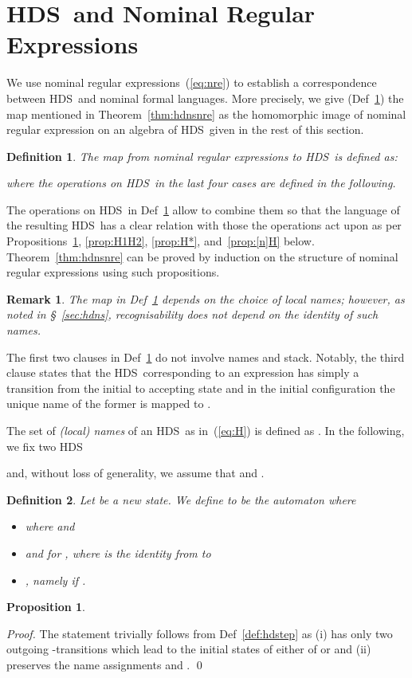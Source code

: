 \documentclass[runningheads,a4paper]{llncs}
\newcommand{\longversion}[1]{#1}
\newcommand{\hdns}{HDS}
\newtheorem{definition}{Theorem}[section]
\newtheorem{proposition}{Theorem}[section]
\newtheorem{remark}{Theorem}[section]
\newtheorem{definition}{Definition}[section]
\newtheorem{proposition}{Proposition}[section]
\newtheorem{remark}{Remark}[section]
\begin{document}
\section{\hdns\ and Nominal Regular Expressions}\label{sec:hsnre}
We use nominal regular expressions~(\ref{eq:nre}) to establish a
correspondence between \hdns\ and nominal formal languages.
More precisely, we give (Def~\ref{def:nretohdns}) the map mentioned in
Theorem~\ref{thm:hdnsnre} as the homomorphic image of nominal regular
expression on an algebra of \hdns\ given in the rest of this section.
\begin{definition}\label{def:nretohdns}
   The map  from nominal regular expressions to \hdns\
  is defined as:
  
  where the operations on \hdns\ in the last four cases are defined in
  the following.
\end{definition}
The operations on \hdns\ in Def~\ref{def:nretohdns} allow to combine
them so that the language of the resulting \hdns\ has a clear relation
with those the operations act upon as per
Propositions~\ref{prop:hdsum}, \ref{prop:H1H2}, \ref{prop:H*},
and~\ref{prop:[n]H} below.
Theorem~\ref{thm:hdnsnre} can be proved by induction on the structure
of nominal regular expressions using such propositions.
\begin{remark}\label{rmk:nretohdns}
  The map  in Def~\ref{def:nretohdns} depends
  on the choice of local names; however, as noted in
  \S~\ref{sec:hdns}, recognisability does not depend on the identity
  of such names.
\end{remark}

The first two clauses in Def~\ref{sec:hsnre} do not involve names and
stack.
Notably, the third clause states that the \hdns\ corresponding to an
expression  has simply a transition from the initial to accepting
state and in the initial configuration the unique name of the former
is mapped to .

The set  of \emph{(local) names} of an \hdns\
 as in~(\ref{eq:H}) is defined as .
In the following, we fix two \hdns

and, without loss of generality, we assume that 
and .

\begin{definition}\label{def:hdsum}
  Let  be a new state.
We define  to be the automaton
   where
  \begin{itemize}
  \item  where
     and 
  \item  and  for , where  is the identity from  to 
  \item , namely  if
    .
  \end{itemize}
\end{definition}
\begin{proposition}\label{prop:hdsum}
  
\end{proposition}
\longversion{
  \begin{proof}
    The statement trivially follows from Def~\ref{def:hdstep} as
    (i)
     has only two outgoing -transitions which lead
    to the initial states of either of  or 
    and (ii)
     preserves the name assignments  and .
    \qed
  \end{proof}
}
\end{document}
